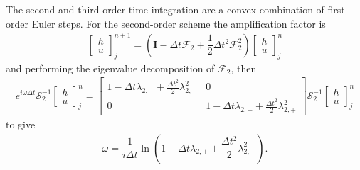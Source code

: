 \documentclass[preprint,sort&compress,1p]{article}
\begin{document}
The second and third-order time integration are a convex combination of first-order Euler steps. For the second-order scheme the amplification factor is
\begin{align}
\left[\begin{array}{c}
h \\ u
\end{array}\right]^{n+1}_j = \left(\boldsymbol{I}  - \Delta t\boldsymbol{\mathcal{F}}_2 + \dfrac{1}{2} \Delta t^2\boldsymbol{\mathcal{F}}^2_2 \right) \left[\begin{array}{c}
h \\ u
\end{array}\right]^n_j
\end{align}
and performing the eigenvalue decomposition of $\boldsymbol{\mathcal{F}}_2$, then
\begin{align}
e^{i\omega\Delta t} \boldsymbol{\mathcal{S}}_2^{-1}\left[\begin{array}{c}
h \\ u
\end{array}\right]^{n}_j = \left[\begin{array}{cc}
1 - \Delta t\lambda_{2,-} + \frac{\Delta t^2}{2} \lambda_{2,-}^2  & 0 \\0  & 1 - \Delta t\lambda_{2,-} + \frac{\Delta t^2}{2} \lambda_{2,+}^2
\end{array}\right]  \boldsymbol{\mathcal{S}}_2^{-1}\left[\begin{array}{c}
h \\ u
\end{array}\right]^n_j
\end{align}
to give
\begin{align}
\label{eq:omega_second-order}
\omega = \dfrac{1}{i \Delta t} \ln \left(1 - \Delta t\lambda_{2,\pm} + \dfrac{\Delta t^2}{2} \lambda_{2,\pm}^2  \right).
\end{align}
\end{document}
